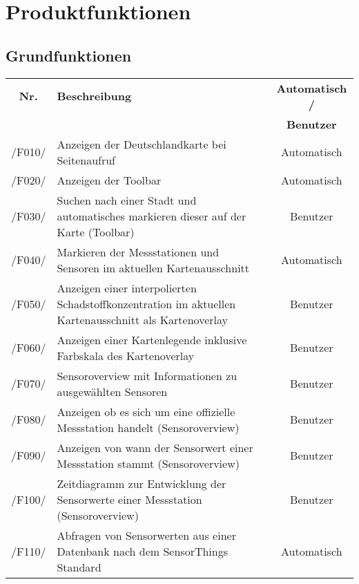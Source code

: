 \clearpage
\section{Produktfunktionen}
\subsection{Grundfunktionen}
\begin{tabularx}{\textwidth}{| c | X | c |}
\hline
        \textbf{Nr.} & 
        \textbf{Beschreibung} & 
        \textbf{Automatisch /} \\
        & & \textbf{Benutzer} \\
        \hline
        /F010/ & Anzeigen der Deutschlandkarte bei Seitenaufruf & Automatisch \\
        \hline
        /F020/ & Anzeigen der Toolbar & Automatisch \\
        \hline
        /F030/ & Suchen nach einer Stadt und automatisches markieren dieser auf der Karte (Toolbar) & Benutzer \\
        \hline
        /F040/ & Markieren der Messstationen und Sensoren im aktuellen Kartenausschnitt & Automatisch \\
        \hline
        /F050/ & Anzeigen einer interpolierten Schadstoffkonzentration im aktuellen Kartenausschnitt als Kartenoverlay & Benutzer \\
        \hline
        /F060/ & Anzeigen einer Kartenlegende inklusive Farbskala des Kartenoverlay & Benutzer \\
        \hline
        /F070/ & Sensoroverview mit Informationen zu ausgewählten Sensoren & Benutzer \\
        \hline
        /F080/ & Anzeigen ob es sich um eine offizielle Messstation handelt (Sensoroverview) & Benutzer \\
        \hline
        /F090/ & Anzeigen von wann der Sensorwert einer Messstation stammt (Sensoroverview) & Benutzer \\
        \hline
        /F100/ & Zeitdiagramm zur Entwicklung der Sensorwerte einer Messstation (Sensoroverview) & Benutzer \\
        \hline
        /F110/ & Abfragen von Sensorwerten aus einer Datenbank nach dem SensorThings Standard & Automatisch \\
        \hline
\end{tabularx}
